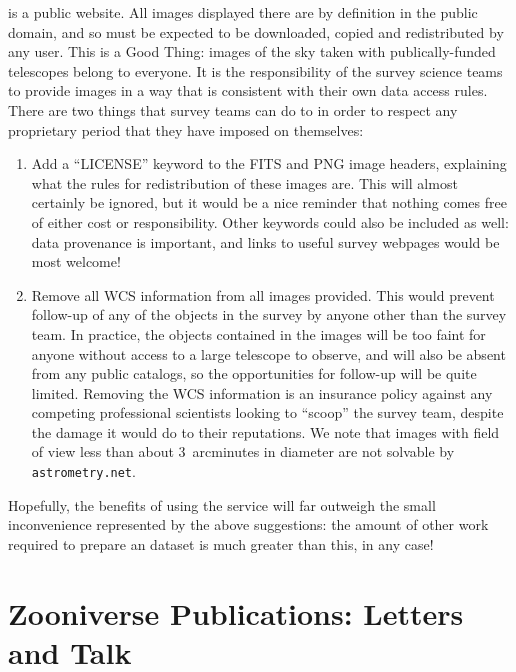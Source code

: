\documentclass[a4paper]{article}
\begin{document}
\sw is a public website. All images displayed there are by definition in the
public domain, and so must be expected to be downloaded, copied and
redistributed by any \sw user. This is a Good Thing: images of the sky taken
with publically-funded telescopes belong to everyone. It is the responsibility
of the survey science teams to provide images in a way that is consistent
with their own data access rules. There are two things that survey teams can
do to in order to respect any proprietary period that they have imposed on
themselves:
\begin{enumerate}

\item Add a ``LICENSE'' keyword to the FITS and PNG image headers, explaining
what the rules for redistribution of these images are. This will almost
certainly be ignored, but it would be a nice reminder that nothing comes free
of either cost or responsibility. Other keywords could also be included as
well: data provenance is important, and links to useful survey webpages would
be most welcome!

\item Remove all WCS information from all images provided. This would prevent
follow-up of any of the objects in the survey by anyone other than the survey
team. In practice, the objects contained in the \sw images will be too faint
for anyone without access to a large telescope to observe, and will also be
absent from any public catalogs, so the opportunities for follow-up will be
quite limited. Removing the WCS information is an insurance policy against any
competing professional scientists looking to ``scoop'' the survey team,
despite the damage it would do to their reputations. We note that images
with field of view less than about 3~arcminutes in diameter are not solvable
by \texttt{astrometry.net}.

\end{enumerate}

Hopefully, the benefits of using the \sw service will far outweigh the small
inconvenience represented by the above suggestions: the amount of other work
required to prepare an \sw dataset is much greater than this, in any case!



\section{Zooniverse Publications: Letters and Talk }
\label{sec:series}
\end{document}
